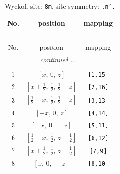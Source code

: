 \documentclass[fleqn,8pt]{jsarticle}
\begin{document}
\begin{longtable}{ccc}
\caption{Wyckoff site: {\tt 8m}, site symmetry: {\tt .m'.}}
 \\
 \hline \hline
No. & position & mapping \\ \hline \endfirsthead

\multicolumn{2}{l}{\tablename\ \thetable{}} \\
 \hline \hline
No. & position & mapping \\ \hline \endhead

 \hline \hline
\multicolumn{2}{r}{\footnotesize\it continued ...} \\ \endfoot

 \hline \hline
\multicolumn{2}{r}{} \\ \endlastfoot

1 & $\left[ x,\, 0,\, z \right]$ & {\tt [1,15]} \\ \hline
2 & $\left[ x + \frac{1}{2},\, \frac{1}{2},\, \frac{1}{2} - z \right]$ & {\tt [2,16]} \\ \hline
3 & $\left[ \frac{1}{2} - x,\, \frac{1}{2},\, \frac{1}{2} - z \right]$ & {\tt [3,13]} \\ \hline
4 & $\left[ - x,\, 0,\, z \right]$ & {\tt [4,14]} \\ \hline
5 & $\left[ - x,\, 0,\, - z \right]$ & {\tt [5,11]} \\ \hline
6 & $\left[ \frac{1}{2} - x,\, \frac{1}{2},\, z + \frac{1}{2} \right]$ & {\tt [6,12]} \\ \hline
7 & $\left[ x + \frac{1}{2},\, \frac{1}{2},\, z + \frac{1}{2} \right]$ & {\tt [7,9]} \\ \hline
8 & $\left[ x,\, 0,\, - z \right]$ & {\tt [8,10]} \\
\end{longtable}
\renewcommand{\arraystretch}{1.2}
\end{document}

